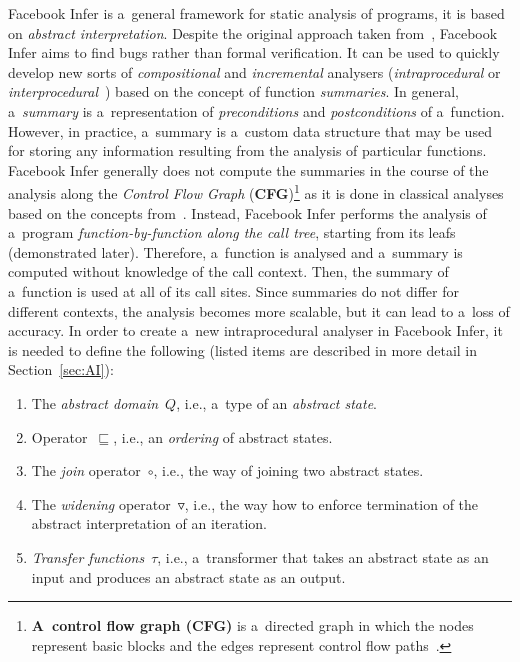 Facebook Infer is a~general framework for static analysis of programs, it is
based on \emph{abstract interpretation}. Despite the original approach 
taken from~\cite{inferBiabduction}, Facebook Infer  aims to find bugs rather
than formal verification. It can be used to quickly develop new sorts of
\emph{compositional} and \emph{incremental} analysers (\emph{intraprocedural} 
or \emph{interprocedural}~\cite{programAnalysisNielson}) based
on the concept of function \emph{summaries}. In general, a~\emph{summary}
is a~representation of \emph{preconditions} and \emph{postconditions} of
a~function. However, in practice, a~summary is a~custom data structure that
may be used for storing any information resulting from the analysis of
particular functions. Facebook Infer generally does not compute the summaries
in the course of the analysis along the \emph{Control Flow Graph}
(\textbf{CFG})\footnote{\textbf{A~control flow graph (CFG)} is a~directed
graph in which the nodes represent basic blocks and the edges represent control
flow paths~\cite{controlFlowAnalysisAllen}.} as it is done in classical
analyses based on the concepts from~\cite{dataflowAnalysisGraphReachability,
dataflowAnalysisApproaches}. Instead, Facebook Infer performs the
analysis of a~program \emph{function-by-function along the call tree},
starting from its leafs (demonstrated later). Therefore, a~function
is analysed and a~summary is computed without knowledge of the
call context. Then, the summary of a~function is used at all of its call 
sites. Since summaries do not differ for different contexts, the analysis
becomes more scalable, but it can lead to a~loss of accuracy. In order 
to create a~new intraprocedural analyser in Facebook Infer, it is needed to 
define the following (listed items are described in more detail in
Section~\ref{sec:AI}):
\begin{enumerate}
    \item
        The \emph{abstract domain}~$ Q $, i.e., a~type of an
        \emph{abstract state}.

    \item
        Operator~$ \sqsubseteq $, i.e., an \emph{ordering} of abstract
        states.

    \item
        The \emph{join} operator~$ \circ $, i.e., the way of joining two
        abstract states.

    \item
        The \emph{widening} operator~$ \triangledown $, i.e., the way how to
        enforce termination of the abstract interpretation of an iteration.

    \item
        \emph{Transfer functions}~$ \tau $, i.e., a~transformer that
        takes an abstract state as an input and produces an abstract state
        as an output.
\end{enumerate}
